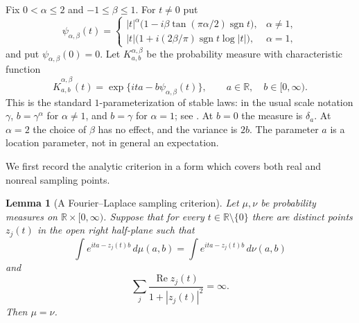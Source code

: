 \documentclass[11pt,letterpaper]{article}
\newtheorem{lemma}[theorem]{Lemma}
\theoremstyle{definition}
\theoremstyle{remark}
\newcommand{\1}{\mathbf 1}
\begin{document}
Fix $0<\alpha\leq 2$ and $-1\leq\beta\leq1$.  For $t\ne0$ put
\begin{equation}\label{p09:eq:stable-exponent}
 \psi_{\alpha,\beta}(t)=
 \begin{cases}
 |t|^\alpha\bigl(1-i\beta\tan(\pi\alpha/2)\operatorname{sgn}t\bigr),
       &\alpha\ne1,\\
 |t|\bigl(1+i(2\beta/\pi)\operatorname{sgn}t\log|t|\bigr),
       &\alpha=1,
 \end{cases}
\end{equation}
and put $\psi_{\alpha,\beta}(0)=0$.
Let $K_{a,b}^{\alpha,\beta}$ be the probability measure with characteristic
function
\begin{equation}\label{p09:eq:stable-kernel}
 \widehat K_{a,b}^{\alpha,\beta}(t)
       =\exp\{ita-b\psi_{\alpha,\beta}(t)\},
 \qquad a\in\mathbb R,\quad b\in[0,\infty).
\end{equation}
This is the standard $1$-parameterization of stable laws: in the usual
scale notation $\gamma$, $b=\gamma^\alpha$ for $\alpha\ne1$, and
$b=\gamma$ for $\alpha=1$; see \cite[Definition~1.8]{Nolan2018}.
At $b=0$ the measure is $\delta_a$.  At $\alpha=2$ the choice of $\beta$
has no effect, and the variance is $2b$.
The parameter $a$ is a location parameter, not in general an expectation.

We first record the analytic criterion in a form which covers both real
and nonreal sampling points.

\begin{lemma}[A Fourier--Laplace sampling criterion]
\label{p09:lem:stable-sampling}
Let $\mu,\nu$ be probability measures on $\mathbb R\times[0,\infty)$.
Suppose that for every $t\in\mathbb R\setminus\{0\}$ there are distinct
points $z_j(t)$ in the open right half-plane such that
\begin{equation}\label{p09:eq:stable-zero-data}
 \int e^{ita-z_j(t)b}\,d\mu(a,b)
 =\int e^{ita-z_j(t)b}\,d\nu(a,b)
\end{equation}
and
\begin{equation}\label{p09:eq:stable-zero-divergence}
 \sum_j\frac{\operatorname{Re}z_j(t)}{1+|z_j(t)|^2}=\infty.
\end{equation}
Then $\mu=\nu$.
\end{lemma}
\end{document}
